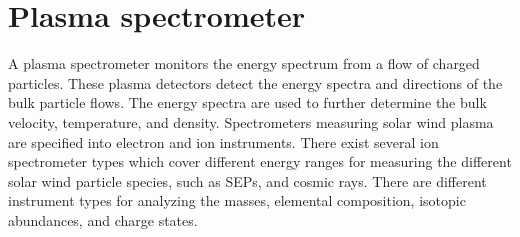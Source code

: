 
% 
% 
% 


\section{Plasma spectrometer}
\label{sec:plasma_spectrometer}
A plasma spectrometer monitors the energy spectrum from a flow of charged particles. These plasma detectors detect the energy spectra and directions of the bulk particle flows. The energy spectra are used to further determine the bulk velocity, temperature, and density. Spectrometers measuring solar wind plasma are specified into electron and ion instruments. There exist several ion spectrometer types which cover different energy ranges for measuring the different solar wind particle species, such as SEPs, and cosmic rays. There are different instrument types for analyzing the masses, elemental composition, isotopic abundances, and charge states.

